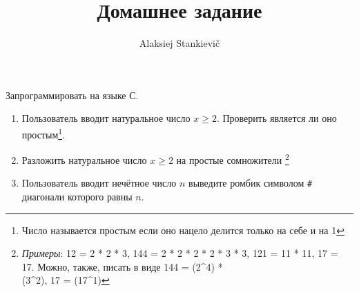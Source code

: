 \documentclass[12pt]{article}
\author{Alaksiej Stankievič}
\title{Домашнее задание}
\begin{document}


 Запрограммировать на языке С.
 \begin{enumerate}
  \item Пользователь вводит натуральное число $x\geq{}2$. Проверить является ли оно простым\footnote{Число называется простым если оно нацело делится только на себе и на 1}.
 \item Разложить натуральное число $x\geq{}2$ на простые сомножители  
 \footnote{\textit{Примеры}: 12 = 2 * 2 * 3,  144 = 2 * 2 * 2 * 2 * 3 * 3, 121 = 11 * 11, 17 = 17. Можно, также, писать в виде 144 = (2\textasciicircum4) *\\ (3\textasciicircum2), 17 = (17\textasciicircum1)}
  \item Пользователь вводит нечётное число $n$ выведите ромбик символом \verb|#| диагонали которого равны $n$.
 \end{enumerate}
\end{document}
